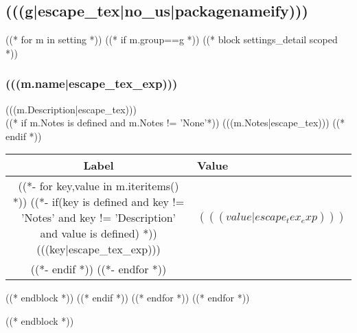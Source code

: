\subsection{(((g|escape_tex|no_us|packagenameify)))}
((* for m in setting *))
((* if m.group==g *))
((* block settings_detail scoped *))
\begin{minipage}{\textwidth}
\hfill
\subsubsection*{(((m.name|escape_tex_exp)))}
\label{sec:(((m.name)))}
\begin{large}
(((m.Description|escape_tex)))\\
((* if m.Notes is defined and m.Notes != 'None'*))
(((m.Notes|escape_tex)))
((* endif *))
\end{large}
\begin{table}[H]
  \centering
  \begin{tabularx}{0.60\textwidth}{cX}
    \toprule
    Label & Value \\
    \midrule
    \hbadness=20000
    ((*- for key,value in m.iteritems() *))
    ((*- if(key is defined and key != 'Notes' and key != 'Description' and value is defined) *))
    (((key|escape_tex_exp))) & $(((value|escape_tex_exp)))$ \\
    ((*- endif *))
    ((*- endfor *))
    \bottomrule
  \end{tabularx}
\end{table}
\end{minipage}
((* endblock *))
((* endif *))
((* endfor *))
((* endfor *))

((* endblock *))
